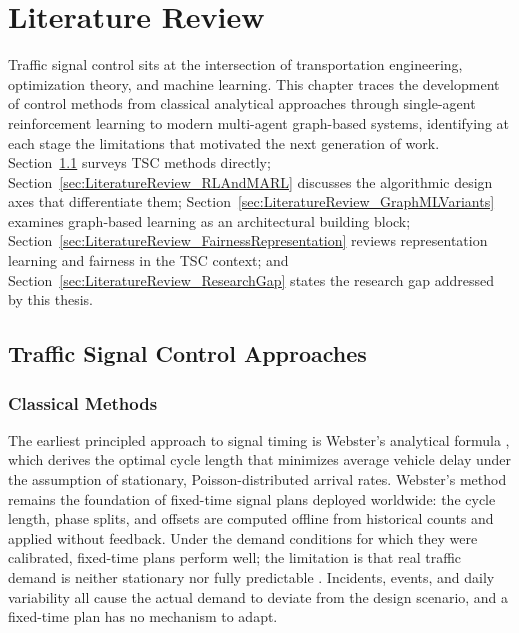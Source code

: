 \chapter{Literature Review}
\label{ch:LiteratureReview}

Traffic signal control sits at the intersection of transportation engineering, optimization theory, and machine learning. This chapter traces the development of control methods from classical analytical approaches through single-agent reinforcement learning to modern multi-agent graph-based systems, identifying at each stage the limitations that motivated the next generation of work. Section~\ref{sec:LiteratureReview_ExistingTSCApproaches} surveys TSC methods directly; Section~\ref{sec:LiteratureReview_RLAndMARL} discusses the algorithmic design axes that differentiate them; Section~\ref{sec:LiteratureReview_GraphMLVariants} examines graph-based learning as an architectural building block; Section~\ref{sec:LiteratureReview_FairnessRepresentation} reviews representation learning and fairness in the TSC context; and Section~\ref{sec:LiteratureReview_ResearchGap} states the research gap addressed by this thesis.

\section{Traffic Signal Control Approaches}
\label{sec:LiteratureReview_ExistingTSCApproaches}

\subsection{Classical Methods}
\label{sec:LiteratureReview_ClassicalTSC}

The earliest principled approach to signal timing is Webster's analytical formula \citep{webster1958traffic}, which derives the optimal cycle length that minimizes average vehicle delay under the assumption of stationary, Poisson-distributed arrival rates. Webster's method remains the foundation of fixed-time signal plans deployed worldwide: the cycle length, phase splits, and offsets are computed offline from historical counts and applied without feedback. Under the demand conditions for which they were calibrated, fixed-time plans perform well; the limitation is that real traffic demand is neither stationary nor fully predictable \citep{hunt1981scoot,lowrie1990scats}. Incidents, events, and daily variability all cause the actual demand to deviate from the design scenario, and a fixed-time plan has no mechanism to adapt.

